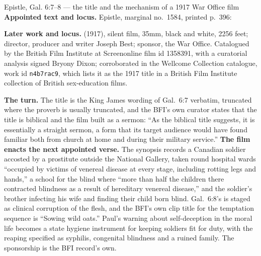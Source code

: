\begin{afterlife}{Epistle, Gal. 6:7--8 --- the title and the mechanism of a 1917 War Office film}
\textbf{Appointed text and locus.} Epistle, marginal no.~1584, printed p.~396:

\textbf{Later work and locus.}  (1917), silent film,
35mm, black and white, 2256 feet; director, producer and writer Joseph Best;
sponsor, the War Office. Catalogued by the British Film Institute at Screenonline
film id 1358391, with a curatorial analysis signed Bryony Dixon; corroborated in
the Wellcome Collection catalogue, work id \texttt{n4b7rac9}, which lists it as
the 1917 title in a British Film Institute collection of British sex-education
films.

\textbf{The turn.} The title is the King James wording of Gal.\ 6:7 verbatim,
truncated where the proverb is usually truncated, and the BFI's own curator states
that the title is biblical and the film built as a sermon: ``As the biblical title
suggests, it is essentially a straight sermon, a form that its target audience
would have found familiar both from church at home and during their military
service.'' \textbf{The film enacts the next appointed verse.} The synopsis
records a Canadian soldier accosted by a prostitute outside the National Gallery, taken round hospital wards ``occupied
by victims of venereal disease at every stage, including rotting legs and hands,''
a school for the blind where ``more than half the children there contracted
blindness as a result of hereditary venereal disease,'' and the soldier's brother
infecting his wife and finding their child born blind. Gal.\ 6:8's  is staged as clinical corruption of the flesh, and the
BFI's own clip title for the temptation sequence is ``Sowing wild oats.'' Paul's
warning about self-deception in the moral life becomes a state hygiene instrument
for keeping soldiers fit for duty, with the reaping specified as syphilis,
congenital blindness and a ruined family. The sponsorship is the BFI record's own.
\end{afterlife}

